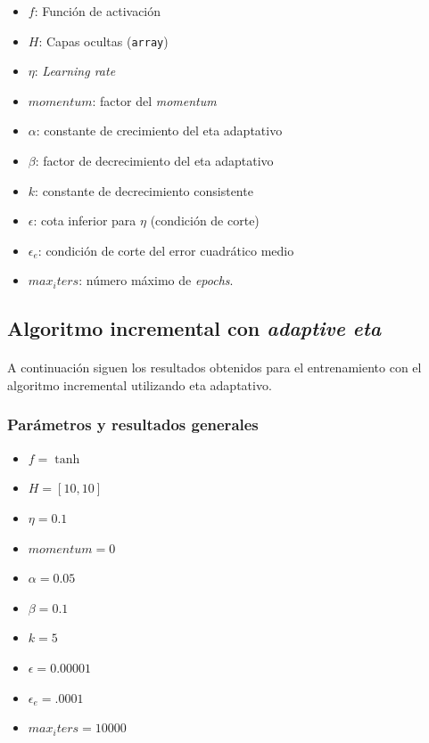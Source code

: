 \documentclass[12pt, twocolumn]{article}
\begin{document}
	\begin{itemize}
		\item $f$: Función de activación
		\item $H$: Capas ocultas (\verb|array|)
		\item $\eta$: \textit{Learning rate}
		\item $momentum$: factor del \textit{momentum}
		\item $\alpha$: constante de crecimiento del eta adaptativo
		\item $\beta$: factor de decrecimiento del eta adaptativo
		\item $k$: constante de decrecimiento consistente
		\item $\epsilon$: cota inferior para $\eta$ (condición de corte)
		\item $\epsilon_{e}$: condición de corte del error cuadrático medio
		\item $max_iters$: número máximo de \textit{epochs}.
		
	\end{itemize}
	
	\subsection{Algoritmo incremental con \textit{adaptive eta}}
	
	\paragraph{} A continuación siguen los resultados obtenidos para el entrenamiento con el algoritmo incremental utilizando eta adaptativo.  
	
	\subsubsection{Parámetros y resultados generales} 
	
	\begin{itemize}
		\item $f = \tanh$
		\item $H = \left[10, 10\right]$
		\item $\eta = 0.1$
		\item $momentum = 0$
		\item $\alpha = 0.05$
		\item $\beta = 0.1$
		\item $k = 5$
		\item $\epsilon = 0.00001$
		\item $\epsilon_{e} = .0001$
		\item $max_iters = 10000$
	\end{itemize}
	
\end{document}
